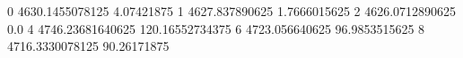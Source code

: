 0 4630.1455078125 4.07421875
1 4627.837890625 1.7666015625
2 4626.0712890625 0.0
4 4746.23681640625 120.16552734375
6 4723.056640625 96.9853515625
8 4716.3330078125 90.26171875
